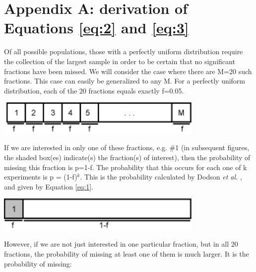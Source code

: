 \documentclass[12]{article}
\begin{document}
\section*{Appendix A: derivation of Equations \ref{eq:2} and \ref{eq:3}}

\begin{minipage}[c]{\textwidth}

Of  all   possible  populations,   those  with  a   perfectly  uniform
distribution require the collection of  the largest sample in order to
be certain  that no significant  fractions have been missed.   We will
consider the case where there  are M=20 such fractions.  This case can
easily be generalized to any M.  For a perfectly uniform distribution,
each of the 20 fractions equals exactly f=0.05.

  \begin{center}
  \includegraphics[width=10cm]{A1.jpg}  
  \end{center}

If we  are interested in  only one of  these fractions, e.g.   \#1 (in
subsequent figures, the shaded  box(es) indicate(s) the fraction(s) of
interest), then the probability of missing this fraction is p=1-f. The
probability that  this occurs  for each  one of k  experiments is  p =
(1-f)$^k$. This is  the probability calculated by Dodson  {\it et al.}
\cite{dodson1988}, and given by Equation \ref{eq:1}.

  \begin{center}
  \includegraphics[width=10cm]{A2.jpg}  
  \end{center}

However, if we are not just interested in one particular fraction, but
in all 20  fractions, the probability of missing at  least one of them
is much larger. It is the probability of missing:
\end{minipage}
\end{document}
